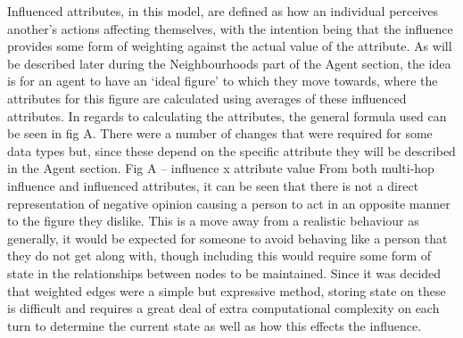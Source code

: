\documentclass[]{report}
\begin{document}
Influenced attributes, in this model, are defined as how an individual perceives another's actions affecting themselves, with the intention being that the influence provides some form of weighting against the actual value of the attribute. As will be described later during the Neighbourhoods part of the Agent section, the idea is for an agent to have an `ideal figure' to which they move towards, where the attributes for this figure are calculated using averages of these influenced attributes. In regards to calculating the attributes, the general formula used can be seen in fig A. There were a number of changes that were required for some data types but, since these depend on the specific attribute they will be described in the Agent section. 
Fig A – influence x attribute value
From both multi-hop influence and influenced attributes, it can be seen that there is not a direct representation of negative opinion causing a person to act in an opposite manner to the figure they dislike. This is a move away from a realistic behaviour as generally, it would be expected for someone to avoid behaving like a person that they do not get along with, though including this would require some form of state in the relationships between nodes to be maintained. Since it was decided that weighted edges were a simple but expressive method, storing state on these is difficult and requires a great deal of extra computational complexity on each turn to determine the current state as well as how this effects the influence. 
\end{document}
